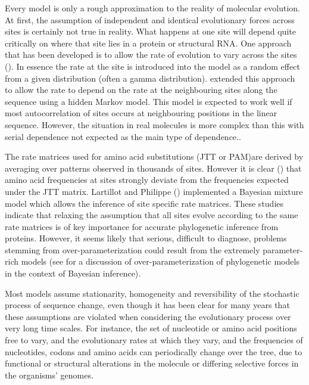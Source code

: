 Every model is only a rough approximation to the reality of molecular evolution. At first, the assumption of independent and identical evolutionary forces across sites is certainly not true in reality. What happens at one site will depend quite critically on where that site lies in a protein or structural RNA. One approach that has been developed is to allow the rate of evolution to vary across the sites (\cite{goldman1994codon}). In essence the rate at the site is introduced into the model as a random effect from a given distribution (often a gamma distribution). \cite{felsenstein1996hidden} extended this approach to allow the rate to depend on the rate at the neighbouring sites along the sequence using a hidden Markov model. This model is expected to work well if most autocorrelation of sites occurs at neighbouring positions in the linear sequence. However, the situation in real molecules is more complex than this with serial dependence not expected as the main type of dependence.. 

The rate matrices used for amino acid substitutions (JTT or PAM)are derived by averaging over patterns observed in thousands of sites. However it is clear (\cite{halpern1998evolutionary,parisi2001structural,susko2002testing}) that amino acid frequencies at sites strongly deviate from the frequencies expected under the JTT matrix.  Lartillot and Philippe (\cite{lartillot2004bayesian}) implemented a Bayesian mixture model which allows the inference of site specific rate matrices. These studies indicate that relaxing the assumption that all sites evolve according to the same rate matrices is of key importance for accurate phylogenetic inference from proteins. However, it seems likely that serious, difficult to diagnose, problems stemming from over-parameterization could result from the extremely parameter-rich models (see \cite{rannala2002identifiability} for a  discussion of over-parameterization of phylogenetic models in the context of Bayesian inference).

Most models  assume stationarity, homogeneity and reversibility of the stochastic process of sequence change, even though it has been clear for many years that these assumptions are violated when considering the evolutionary process over very long time scales. For instance, the set of nucleotide or amino acid positions free to vary, and the evolutionary rates at which they vary, and the frequencies of nucleotides, codons
and amino acids can periodically change over the tree, due to functional or structural alterations in the molecule or differing selective forces in the organisms' genomes.

